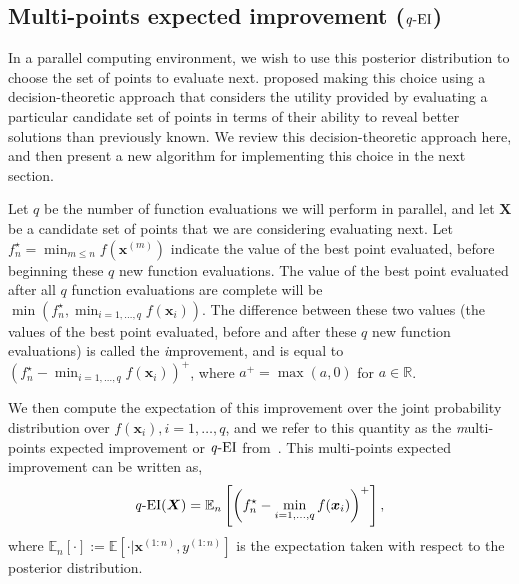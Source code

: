\documentclass[paper=letter]{scrartcl}
\newcommand{\x}[1]{\bm{x}^{(#1)}}
\newcommand{\y}[1]{y^{(#1)}}
\newcommand{\R}{\mathbb{R}}
\newcommand{\qEI}{\text{\textit q-EI}}
\begin{document}

\subsection{Multi-points expected improvement ($\qEI$)}
In a parallel computing environment, we wish to use this posterior distribution
to choose the set of points to evaluate next. \cite{GiLeCa08}
proposed making this choice using a decision-theoretic approach that
considers the utility provided by evaluating a particular candidate set of
points in terms of their ability to reveal better solutions 
than previously known.  We review this decision-theoretic approach here, and then present a new algorithm for implementing this choice in the next section. 

Let $q$ be the number of function evaluations we will perform in parallel,
and let $\bm{X}$ be a candidate 
set of points that we are considering evaluating next. 
Let $f_{n}^{\star} = \min_{m \leq n} f(\x{m})$ 
indicate the value of the best point evaluated, before beginning these $q$ 
new function evaluations. The value of the best point evaluated after all $q$ 
function evaluations are complete will be $\min\left(f_n^{\star},\min_{i = 1,\ldots,q} f(\bm{x}_i )\right)$.
The difference between these two values (the values of the best point evaluated, 
before and after these $q$ new function evaluations) is called the {\textit improvement}, 
and is equal to $\left( f_{n}^{\star} - \min_{i = 1,\ldots,q} f(\bm{x}_i ) \right)^{+}$, 
where $a^+ = \max(a,0)$ for $a\in\R$.

We then compute the expectation of this improvement over the joint probability distribution over $f(\bm{x}_i), i=1,\ldots,q$,
and we refer to this quantity as the 
{\textit multi-points expected improvement} or $\qEI$ from~\cite{GiLeCa08}.  This multi-points 
expected improvement can be written as,
\begin{equation}
\qEI (\bm{X} )=\mathbb{E}_n\left[\left( f_{n}^{\star} - \min_{i = 1,\ldots,q} f(\bm{x}_i ) \right)^{+} \right],
\label{eq:multiEI}
\end{equation}
where $\mathbb{E}_n \left[ \cdot \right] := \mathbb{E} \left[\cdot |\x{1:n}, \y{1:n} \right]$ 
is the expectation taken with respect to the posterior distribution.
\end{document}
